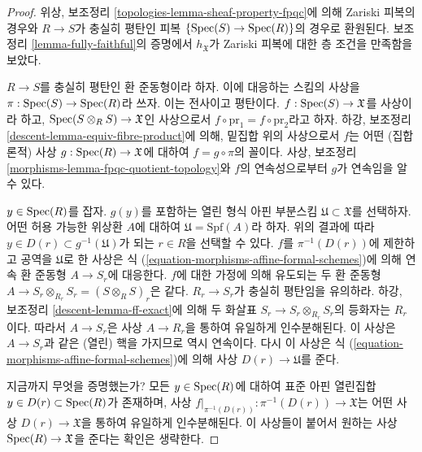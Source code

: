 \begin{proof}
위상, 보조정리 \ref{topologies-lemma-sheaf-property-fpqc}에 의해
Zariski 피복의 경우와 $R \to S$가 충실히 평탄인 피복
$\{\mathop{\mathrm{Spec}}(S) \to \mathop{\mathrm{Spec}}(R)\}$의 경우로 환원된다.
보조정리 \ref{lemma-fully-faithful}의 증명에서
$h_\mathfrak X$가 Zariski 피복에 대한 층 조건을 만족함을 보았다.

\medskip\noindent
$R \to S$를 충실히 평탄인 환 준동형이라 하자. 이에 대응하는
스킴의 사상을 $\pi : \mathop{\mathrm{Spec}}(S) \to \mathop{\mathrm{Spec}}(R)$라 쓰자. 이는 전사이고
평탄이다. $f : \mathop{\mathrm{Spec}}(S) \to \mathfrak X$를 사상이라 하고,
$\mathop{\mathrm{Spec}}(S \otimes_R S) \to \mathfrak X$인 사상으로서
$f \circ \text{pr}_1 = f \circ \text{pr}_2$라고 하자.
하강, 보조정리 \ref{descent-lemma-equiv-fibre-product}에 의해,
밑집합 위의 사상으로서 $f$는 어떤 (집합론적) 사상
$g : \mathop{\mathrm{Spec}}(R) \to \mathfrak X$에 대하여 $f = g \circ \pi$의
꼴이다. 사상, 보조정리
\ref{morphisms-lemma-fpqc-quotient-topology}와 $f$의 연속성으로부터
$g$가 연속임을 알 수 있다.

\medskip\noindent
$y \in \mathop{\mathrm{Spec}}(R)$를 잡자. $g(y)$를 포함하는 열린 형식 아핀 부분스킴
$\mathfrak U \subset \mathfrak X$를 선택하자. 어떤 허용 가능한
위상환 $A$에 대하여 $\mathfrak U = \text{Spf}(A)$라 하자.
위의 결과에 따라 $y \in D(r) \subset g^{-1}(\mathfrak U)$가 되는
$r \in R$을 선택할 수 있다. $f$를 $\pi^{-1}(D(r))$에 제한하고
공역을 $\mathfrak U$로 한 사상은 식
(\ref{equation-morphisms-affine-formal-schemes})에 의해 연속 환 준동형
$A \to S_r$에 대응한다. $f$에 대한 가정에 의해 유도되는 두 환 준동형
$A \to S_r \otimes_{R_r} S_r = (S \otimes_R S)_r$은 같다.
$R_r \to S_r$가 충실히 평탄임을 유의하라. 하강, 보조정리
\ref{descent-lemma-ff-exact}에 의해 두 화살표
$S_r \to S_r \otimes_{R_r} S_r$의 등화자는 $R_r$이다.
따라서 $A \to S_r$은 사상 $A \to R_r$을 통하여 유일하게 인수분해된다.
이 사상은 $A \to S_r$과 같은 (열린) 핵을 가지므로 역시 연속이다.
다시 이 사상은 식 (\ref{equation-morphisms-affine-formal-schemes})에 의해
사상 $D(r) \to \mathfrak U$를 준다.

\medskip\noindent
지금까지 무엇을 증명했는가? 모든 $y \in \mathop{\mathrm{Spec}}(R)$에 대하여
표준 아핀 열린집합 $y \in D(r) \subset \mathop{\mathrm{Spec}}(R)$가 존재하며,
사상 $f|_{\pi^{-1}(D(r))} : \pi^{-1}(D(r)) \to \mathfrak X$는
어떤 사상 $D(r) \to \mathfrak X$을 통하여 유일하게 인수분해된다.
이 사상들이 붙어서 원하는 사상 $\mathop{\mathrm{Spec}}(R) \to \mathfrak X$을
준다는 확인은 생략한다.
\end{proof}

